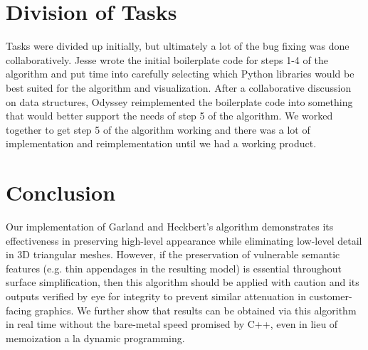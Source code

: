 \documentclass{acmsiggraph}
\begin{document}
\section{Division of Tasks}
Tasks were divided up initially, but ultimately a lot of the bug fixing was done collaboratively. Jesse wrote the initial boilerplate code for steps 1-4 of the algorithm and put time into carefully selecting which Python libraries would be best suited for the algorithm and visualization. After a collaborative discussion on data structures, Odyssey reimplemented the boilerplate code into something that would better support the needs of step 5 of the algorithm. We worked together to get step 5 of the algorithm working and there was a lot of implementation and reimplementation until we had a working product.

\section{Conclusion} %

Our implementation of Garland and Heckbert’s algorithm demonstrates its
effectiveness in preserving high-level appearance while eliminating low-level
detail in 3D triangular meshes. However, if the preservation of vulnerable
semantic features (e.g. thin appendages in the resulting model) is essential
throughout surface simplification, then this algorithm should be applied with
caution and its outputs verified by eye for integrity to prevent similar
attenuation in customer-facing graphics. We further show that results can be
obtained via this algorithm in real time without the bare-metal speed promised
by C++, even in lieu of memoization a la dynamic programming.

\end{document}
